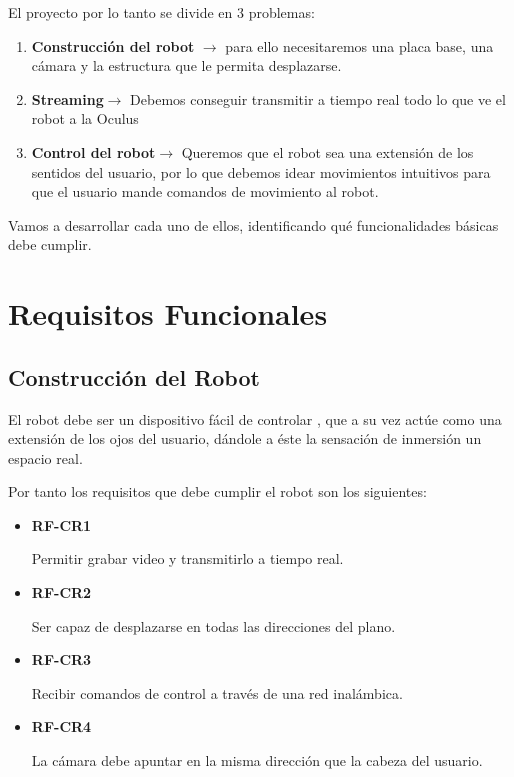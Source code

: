 \documentclass[twoside, 11pt]{epstfg}
\begin{document}
El proyecto por lo tanto se divide en 3 problemas:
\begin{enumerate}
	\item \textbf{Construcción del robot} $\rightarrow$ para ello necesitaremos una placa base, una cámara y la estructura que le permita desplazarse.
	\item \textbf{Streaming}$\rightarrow$ Debemos conseguir transmitir a tiempo real todo lo que ve el robot a la Oculus
	\item \textbf{Control del robot}$\rightarrow$ Queremos que el robot sea una extensión de los sentidos del usuario, por lo que debemos idear movimientos intuitivos para que el usuario mande comandos de movimiento al robot.
\end{enumerate}

Vamos a desarrollar cada uno de ellos, identificando qué funcionalidades básicas debe cumplir.

\section{Requisitos Funcionales}

\subsection{Construcción del Robot}


El robot debe ser un dispositivo fácil de controlar , que a su vez actúe como una extensión de los ojos del usuario, dándole a éste la sensación de inmersión un espacio real.

Por tanto los requisitos que debe cumplir el robot son los siguientes:


\begin{itemize}
	\item \textbf{RF-CR1}
	
	Permitir grabar video y transmitirlo a tiempo real.
	
	
	\item\textbf{RF-CR2} 
	
	Ser capaz de desplazarse en todas las direcciones del plano.
	
	
	\item\textbf{RF-CR3}
	
	Recibir comandos de control a través de una red inalámbica.
	
	
	\item\textbf{RF-CR4} 
	
	La cámara debe apuntar en la misma dirección que la cabeza del usuario.
\end{itemize}
\end{document}
